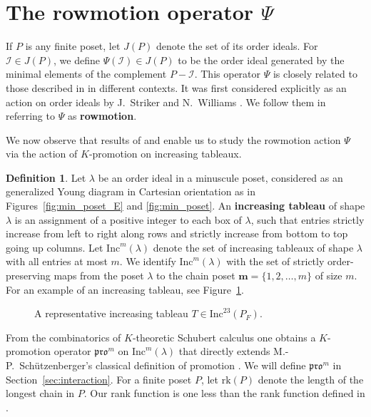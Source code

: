 \documentclass[12pt]{amsart}
\theoremstyle{definition}
\newtheorem{definition}[theorem]{Definition}
\theoremstyle{remark}
\numberwithin{equation}{section}
\newcommand{\inc}{\ensuremath{\mathrm{Inc}}}
\newcommand{\pro}{\mathfrak{pro}}
\newcommand{\rank}{\ensuremath{\mathrm{rk}}}
\newcommand{\uu}{\mathcal{I}}
\begin{document}
\section{The rowmotion operator $\Psi$}\label{sec:rowmotion}

If $P$ is any finite poset, let $J(P)$ denote the set of its order ideals. For $\uu \in J(P)$, we define $\Psi(\uu) \in J(P)$ to be the order ideal generated by the minimal elements of the complement $P - \uu$. This operator $\Psi$ is closely related to those described in \cite{Brouwer.Schrijver,Duchet,Cameron.Fonderflaass} in different contexts. It was first considered explicitly as an action on order ideals by J.~Striker and N.~Williams \cite{Striker.Williams}. We follow them in referring to $\Psi$ as {\bf rowmotion}.

We now observe that results of \cite{DPS} and \cite{Dilks.Striker.Vorland} enable us to study the rowmotion action $\Psi$ via the action of $K$-promotion on increasing tableaux.

\begin{definition}
Let $\lambda$ be an order ideal in a minuscule poset, considered as an generalized Young diagram in Cartesian orientation as in Figures~\ref{fig:min_poset_E} and \ref{fig:min_poset}. An {\bf increasing tableau} of shape $\lambda$ is an assignment of a positive integer to each box of $\lambda$, such that entries strictly increase from left to right along rows and strictly increase from bottom to top going up columns. Let $\inc^m(\lambda)$ denote the set of increasing tableaux of shape $\lambda$ with all entries at most $m$. We identify $\inc^m(\lambda)$ with the set of strictly order-preserving maps from the poset $\lambda$ to the chain poset $\mathbf{m} = \{1, 2, \dots, m\}$ of size $m$. For an example of an increasing tableau, see Figure~\ref{fig:inctab}.
\end{definition}

\begin{figure}[h]
\caption{A representative increasing tableau $T \in \inc^{23}(P_F)$.}\label{fig:inctab}
\end{figure}

From the combinatorics of $K$-theoretic Schubert calculus one obtains a $K$-promotion operator $\pro^m$ on $\inc^m(\lambda)$ that directly extends M.-P.~Sch\"utzenberger's classical definition of promotion \cite{Schutzenberger:promotion}. We will define $\pro^m$ in Section~\ref{sec:interaction}. For a finite poset $P$, let $\rank(P)$ denote the length of the longest chain in $P$. Our rank function is one less than the rank function defined in \cite{Dilks.Striker.Vorland}. 
\end{document}
